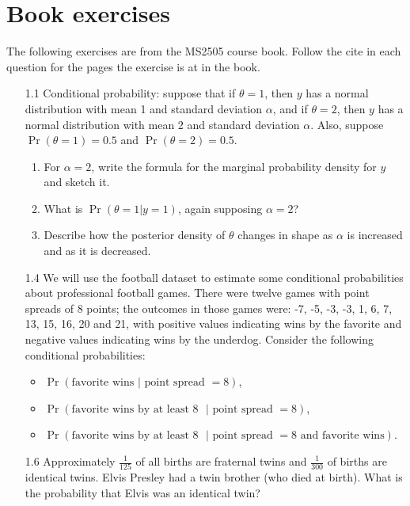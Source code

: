 \documentclass[12pt,a4paper,twoside]{article}
\begin{document}
\section{Book exercises}
The following exercises are from the MS2505 course book\cite{CourseBook}. Follow the cite in each question for the pages
the exercise is at in the book.
\begin{enumerate}
    \item[1.1] Conditional probability: suppose that if $\theta = 1$, then $y$ has a normal distribution with mean
    1 and standard deviation $\alpha$, and if $\theta = 2$, then $y$ has a normal distribution with mean 2
    and standard deviation $\alpha$. Also, suppose $\Pr(\theta = 1) = 0.5$ and $\Pr(\theta = 2) = 0.5$\cite{Chapter1Exercises}.
    \begin{enumerate}[label=$\alph*)$]
        \item For $\alpha = 2$, write the formula for the marginal probability density for $y$ and sketch it.
        \item What is $\Pr(\theta = 1|y = 1)$, again supposing $\alpha = 2$?
        \item Describe how the posterior density of $\theta$ changes in shape as $\alpha$ is increased and as it is
        decreased.
    \end{enumerate}
    \item[1.4] We will use the football dataset to estimate some conditional probabilities about professional football
    games. There were twelve games with point spreads of 8 points; the outcomes in those games were: -7, -5, -3, -3,
    1, 6, 7, 13, 15, 16, 20 and 21, with positive values indicating wins by the favorite and negative values indicating
    wins by the underdog. Consider the following conditional probabilities\cite{Chapter1Exercises}:
    \begin{itemize}
        \item $\Pr(\text{favorite wins }|\text{ point spread }= 8)$,
        \item $\Pr(\text{favorite wins by at least }8\text{ }|\text{ point spread }= 8)$,
        \item $\Pr(\text{favorite wins by at least }8\text{ }| \text{ point spread } = 8\text{ and favorite wins})$.
    \end{itemize} 
    \item[1.6] Approximately $\frac{1}{125}$ of all births are fraternal twins and $\frac{1}{300}$ of births are identical twins.
    Elvis Presley had a twin brother (who died at birth). What is the probability that Elvis was an identical twin?

\end{enumerate}
\end{document}
